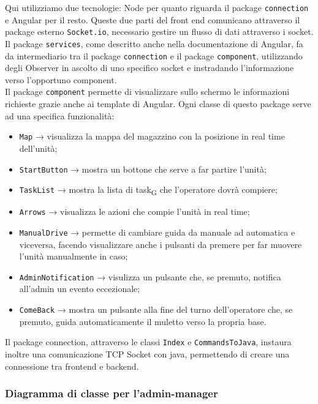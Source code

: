 Qui utilizziamo due tecnologie: Node per quanto riguarda il package \texttt{connection} e Angular per il resto. Queste due parti del front end comunicano attraverso il package esterno \texttt{Socket.io}, necessario gestire un flusso di dati attraverso i socket.\\
Il package \texttt{services}, come descritto anche nella documentazione di Angular, fa da intermediario tra il package \texttt{connection} e il package \texttt{component}, utilizzando degli Observer in ascolto di uno specifico socket e instradando l'informazione verso l'opportuno component.\\
Il package \texttt{component} permette di visualizzare sullo schermo le informazioni richieste grazie anche ai template di Angular. Ogni classe di questo package serve ad una specifica funzionalità:
\begin{itemize}
	\item \texttt{Map} → visualizza la mappa del magazzino con la posizione in real time dell'unità;
	\item \texttt{StartButton} → mostra un bottone che serve a far partire l'unità;
	\item \texttt{TaskList} → mostra la lista di task\textsubscript{G} che l'operatore dovrà compiere;
	\item \texttt{Arrows} → visualizza le azioni che compie l'unità in real time;
	\item \texttt{ManualDrive} → permette di cambiare guida da manuale ad automatica e viceversa, facendo visualizzare anche i pulsanti da premere per far muovere l'unità manualmente in caso;
	\item \texttt{AdminNotification} → visulizza un pulsante che, se premuto, notifica all'admin un evento eccezionale;
	\item \texttt{ComeBack} → mostra un pulsante alla fine del turno dell'operatore che, se premuto, guida automaticamente il muletto verso la propria base.
\end{itemize}
Il package connection, attraverso le classi \texttt{Index} e \texttt{CommandsToJava}, instaura inoltre una comunicazione TCP Socket con java, permettendo di creare una connessione tra frontend e backend.\\

\subsubsection{Diagramma di classe per l'admin-manager}

